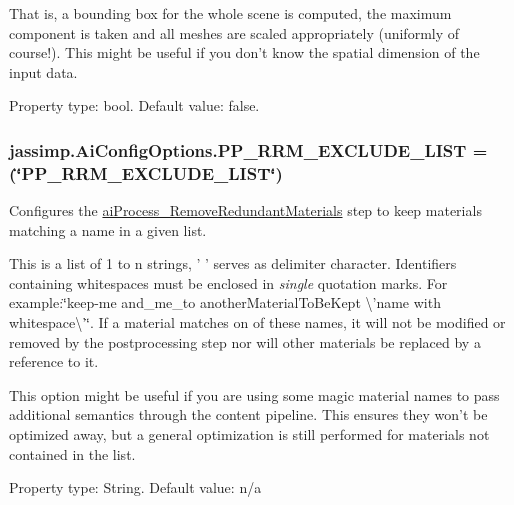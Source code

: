 That is, a bounding box for the whole scene is computed, the maximum component is taken and all meshes are scaled appropriately (uniformly of course!). This might be useful if you don't know the spatial dimension of the input data.

Property type\+: bool. Default value\+: false. \hypertarget{enumjassimp_1_1_ai_config_options_a167d4308d67e41973196793a8d5eba24}{
\subsubsection[{P\+P\+\_\+\+R\+R\+M\+\_\+\+E\+X\+C\+L\+U\+D\+E\+\_\+\+L\+I\+S\+T}]{\setlength{\rightskip}{0pt plus 5cm}jassimp.\+Ai\+Config\+Options.\+P\+P\+\_\+\+R\+R\+M\+\_\+\+E\+X\+C\+L\+U\+D\+E\+\_\+\+L\+I\+S\+T =(\char`\"{}P\+P\+\_\+\+R\+R\+M\+\_\+\+E\+X\+C\+L\+U\+D\+E\+\_\+\+L\+I\+S\+T\char`\"{})}}\label{enumjassimp_1_1_ai_config_options_a167d4308d67e41973196793a8d5eba24}
Configures the \hyperlink{postprocess_8h_a64795260b95f5a4b3f3dc1be4f52e410a052d2921c33cd21141480b8f25524bb1}{ai\+Process\+\_\+\+Remove\+Redundant\+Materials} step to keep materials matching a name in a given list.

This is a list of 1 to n strings, ' ' serves as delimiter character. Identifiers containing whitespaces must be enclosed in {\itshape single} quotation marks. For example\+:{\ttfamily  \char`\"{}keep-\/me and\+\_\+me\+\_\+to another\+Material\+To\+Be\+Kept \textbackslash{}'name with whitespace\textbackslash{}'\char`\"{}}. If a material matches on of these names, it will not be modified or removed by the postprocessing step nor will other materials be replaced by a reference to it.

This option might be useful if you are using some magic material names to pass additional semantics through the content pipeline. This ensures they won't be optimized away, but a general optimization is still performed for materials not contained in the list.

Property type\+: String. Default value\+: n/a

